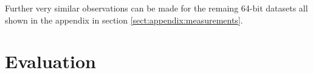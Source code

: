 Further very similar observations can be made for the remaing 64-bit datasets all shown in the appendix in section \ref{sect:appendix:measurements}.

\section{Evaluation}
%
%
%

